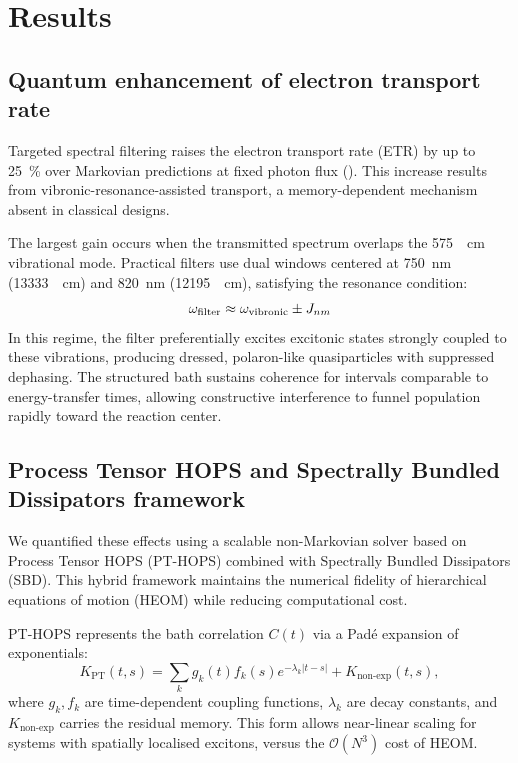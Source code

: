 
\section{Results}\label{sec:Results}

\subsection{Quantum enhancement of electron transport rate}

Targeted spectral filtering raises the electron transport rate (ETR) by up to \SI{25}{\percent} over Markovian predictions at fixed photon flux (). This increase results from vibronic-resonance-assisted transport, a memory-dependent mechanism absent in classical designs.

The largest gain occurs when the transmitted spectrum overlaps the \SI{575}{\per\cm} vibrational mode. Practical filters use dual windows centered at \SI{750}{\nano\meter} (\SI{13333}{\per\cm}) and \SI{820}{\nano\meter} (\SI{12195}{\per\cm}), satisfying the resonance condition:
\begin{equation}\label{eq:resonance_condition}
\omega_{\rm filter}\approx\omega_{\rm vibronic}\pm J_{nm}
\end{equation}
In this regime, the filter preferentially excites excitonic states strongly coupled to these vibrations, producing dressed, polaron-like quasiparticles with suppressed dephasing. The structured bath sustains coherence for intervals comparable to energy-transfer times, allowing constructive interference to funnel population rapidly toward the reaction center.

\subsection{Process Tensor HOPS and Spectrally Bundled Dissipators framework}

We quantified these effects using a scalable non-Markovian solver based on Process Tensor HOPS (PT-HOPS) combined with Spectrally Bundled Dissipators (SBD). This hybrid framework maintains the numerical fidelity of hierarchical equations of motion (HEOM) while reducing computational cost.

PT-HOPS represents the bath correlation $C(t)$ via a Pad\'e expansion of exponentials:
\begin{equation}\label{eq:pt_decomposition}
K_{\mathrm{PT}}(t,s)=\sum_k g_k(t)f_k(s)e^{-\lambda_k|t-s|}+K_{\mathrm{non\text{-}exp}}(t,s),
\end{equation}
where $g_k,f_k$ are time-dependent coupling functions, $\lambda_k$ are decay constants, and $K_{\mathrm{non\text{-}exp}}$ carries the residual memory. This form allows near-linear scaling for systems with spatially localised excitons, versus the $\mathcal{O}(N^3)$ cost of HEOM.

